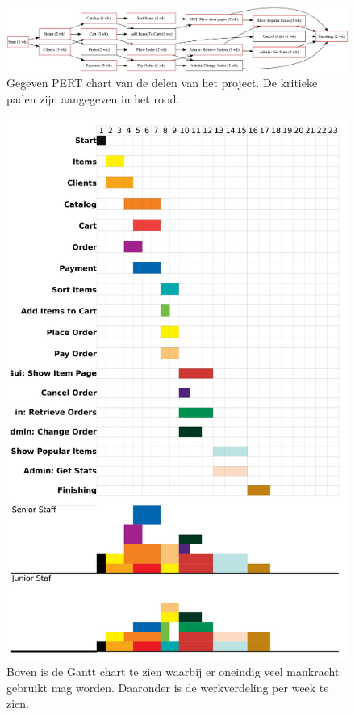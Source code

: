 \documentclass[•]{article}
\begin{document}
\begin{figure}
\centering
\includegraphics[width=13.5cm]{pert.jpg}
\caption{Gegeven PERT chart van de delen van het project. De kritieke paden zijn aangegeven in het rood.}
\label{pert}
\end{figure}

\begin{figure}
\centering
\includegraphics[width=13.5cm]{nolimStaffPlanning.jpg}
\caption{Boven is de Gantt chart te zien waarbij er oneindig veel mankracht gebruikt mag worden. Daaronder is de werkverdeling per week te zien.}
\label{nolimitGantt}
\end{figure}
\end{document}

